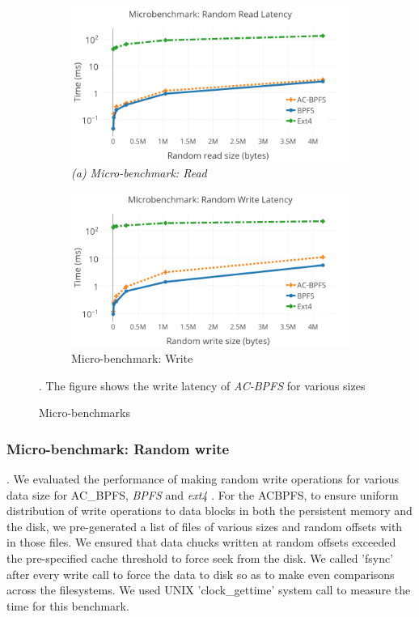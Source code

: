  \begin{figure}[t]\centering
\begin{subfigure}{.49\textwidth}
  \centering
  \includegraphics[width=\textwidth]{figs/read.png}
 	\centering
	\footnotesize\textit{(a) Micro-benchmark: Read}
\end{subfigure}
\begin{subfigure}{.49\textwidth}
  \centering
  \includegraphics[width=\textwidth]{figs/write.png}
\vspace{-0.2in}
\caption{Micro-benchmark: Write}
\end{subfigure}
\caption{Micro-benchmarks}{\footnotesize . The figure shows the write latency of \textit{AC-BPFS} for various sizes}
\label{fig:fig}
\end{figure}

\subsubsection{Micro-benchmark: Random write}
. We evaluated the performance of making random write operations for various data size for AC\_BPFS, \textit{BPFS} and  \textit{ext4} . For the AC\-BPFS, to ensure uniform distribution of write operations to data blocks in both the persistent memory and the disk, we pre-generated a list of files of various sizes and random offsets with in those files. We ensured that data chucks written at random offsets exceeded the pre-specified cache threshold to force seek from the disk. We called 'fsync' after every write call to force the data to disk so as to make even comparisons across the filesystems. We used UNIX 'clock\_gettime' system call to measure the time for this benchmark.

